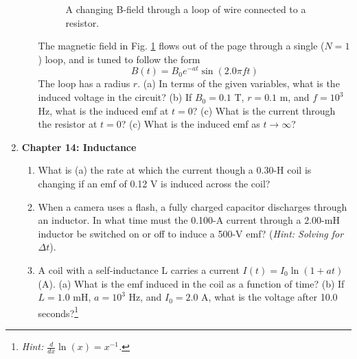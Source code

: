\documentclass[10pt]{article}
\begin{document}
\begin{enumerate}
\begin{enumerate}
\begin{figure}
\caption{\label{fig:flux2} A changing B-field through a loop of wire connected to a resistor.}
\end{figure} 
The magnetic field in Fig. \ref{fig:flux2} flows out of the page through a single ($N=1$) loop, and is tuned to follow the form
\begin{equation}
B(t) = B_0 e^{-at}\sin(2.0\pi f t)
\end{equation}
The loop has a radius $r$.  (a) In terms of the given variables, what is the induced voltage in the circuit? (b) If $B_0 = 0.1$ T, $r = 0.1$ m, and $f = 10^3$ Hz, what is the induced emf at $t=0$?  (c) What is the current through the resistor at $t=0$? (c) What is the induced emf as $t \to \infty$? \\ \vspace{4cm}
\end{enumerate}
\item \textbf{Chapter 14: Inductance}
\begin{enumerate}
\item What is (a) the rate at which the current though a 0.30-H coil is changing if an emf of 0.12 V is induced across the coil?\\ \vspace{1cm}
\item When a camera uses a flash, a fully charged capacitor discharges through an inductor. In what time must the 0.100-A current through a 2.00-mH inductor be switched on or off to induce a 500-V emf? (\textit{Hint: Solving for $\Delta t$}). \\ \vspace{1cm}
\item A coil with a self-inductance L carries a current $I(t) = I_0\ln(1+at)$ (A).  (a) What is the emf induced in the coil as a function of time? (b) If $L = 1.0$ mH, $a = 10^3$ Hz, and $I_0 = 2.0$ A, what is the voltage after 10.0 seconds?\footnote{\textit{Hint: $\frac{d}{dx} \ln(x) = x^{-1}$.}} \\ \vspace{4cm}
\end{enumerate}
\end{enumerate}
\end{document}

